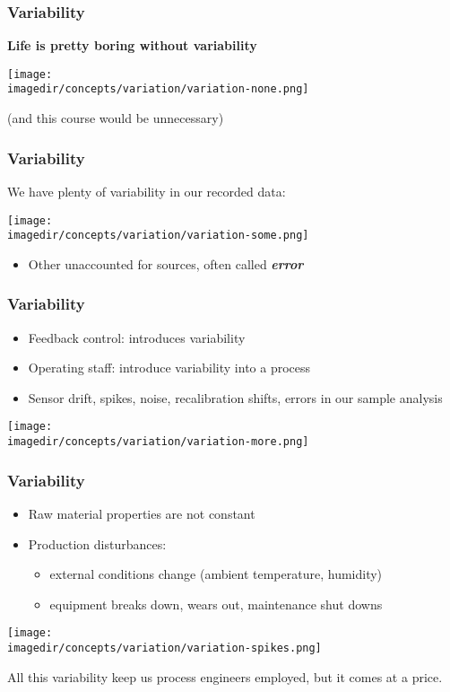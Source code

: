 \begin{frame}\frametitle{Variability}
	\textbf{Life is pretty boring without variability} 
	\begin{center}
		\texttt{[image: \\imagedir/concepts/variation/variation-none.png]}
	\end{center}
	(and this course would be unnecessary)
\end{frame}

\begin{frame}\frametitle{Variability}
	We have plenty of variability in our recorded data:
	\begin{center}
		\texttt{[image: \\imagedir/concepts/variation/variation-some.png]}
	\end{center}
	\begin{itemize}
		\item	Other unaccounted for sources, often called \textbf{\emph{error}}
	\end{itemize}
\end{frame}

\begin{frame}\frametitle{Variability}
	\begin{itemize}
		\item	Feedback control: introduces variability
		\item	Operating staff: introduce variability into a process
		\item	Sensor drift, spikes, noise, recalibration shifts, errors in our sample analysis
	\end{itemize}

	\texttt{[image: \\imagedir/concepts/variation/variation-more.png]}
\end{frame}

\begin{frame}\frametitle{Variability}
	\begin{itemize}
		\item	Raw material properties are not constant
		\item	Production disturbances:
		\begin{itemize}
			\item	external conditions change (ambient temperature, humidity)
			\item	equipment breaks down, wears out, maintenance shut downs
		\end{itemize}
	\end{itemize}

	\texttt{[image: \\imagedir/concepts/variation/variation-spikes.png]}

	All this variability keep us process engineers employed, but it comes at a price.
\end{frame}

